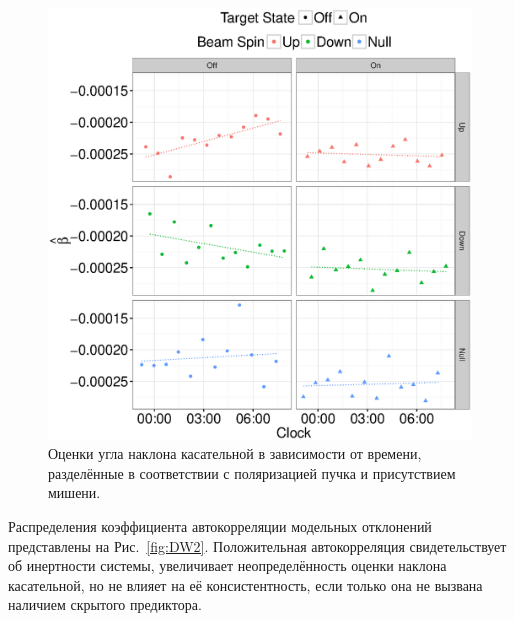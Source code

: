 \documentclass{article}
\begin{document}
	\begin{figure}[h]
		\centering
		\includegraphics[scale=.8]{img/Slopes2016_VS_Clock.eps}
		\caption{Оценки угла наклона касательной в зависимости от времени, разделённые в соответствии с поляризацией пучка и присутствием мишени.\label{fig:Slopes}}
	\end{figure}
	
	Распределения коэффициента автокорреляции модельных отклонений представлены на Рис.~\ref{fig:DW2}. Положительная автокорреляция свидетельствует об инертности системы, увеличивает неопределённость оценки наклона касательной, но не влияет на её консистентность, если только она не вызвана наличием скрытого предиктора. 
\end{document}
